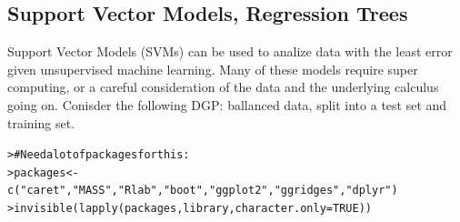 \documentclass[12pt]{article}\usepackage[]{graphicx}\usepackage[]{color}
\makeatletter
\newcommand{\hlnum}[1]{\textcolor[rgb]{0.82,0.78,0.62}{#1}}%
\newcommand{\hlstr}[1]{\textcolor[rgb]{0.82,0.78,0.62}{#1}}%
\newcommand{\hlcom}[1]{\textcolor[rgb]{0.404,0.408,0.42}{#1}}%
\newcommand{\hlstd}[1]{\textcolor[rgb]{0.882,0.878,0.898}{#1}}%
\newcommand{\hlkwb}[1]{\textcolor[rgb]{0.902,0.675,0.196}{#1}}%
\newcommand{\hlkwc}[1]{\textcolor[rgb]{0.812,0.522,0.388}{#1}}%
\newcommand{\hlkwd}[1]{\textcolor[rgb]{0.733,0.388,0.812}{#1}}%
\newenvironment{kframe}{%
 \def\at@end@of@kframe{}%
 \ifinner\ifhmode%
  \def\at@end@of@kframe{\end{minipage}}%
  \begin{minipage}{\columnwidth}%
 \fi\fi%
 \def\FrameCommand##1{\hskip\@totalleftmargin \hskip-\fboxsep
 \colorbox{shadecolor}{##1}\hskip-\fboxsep
     \hskip-\linewidth \hskip-\@totalleftmargin \hskip\columnwidth}%
 \MakeFramed {\advance\hsize-\width
   \@totalleftmargin\z@ \linewidth\hsize
   \@setminipage}}%
 {\par\unskip\endMakeFramed%
 \at@end@of@kframe}
\newenvironment{knitrout}{}{} %
\makeatother
\begin{document}
\begin{flushleft}
\subsection{Support Vector Models, Regression Trees}

Support Vector Models (SVMs) can be used to analize data with the least error given unsupervised machine learning. Many of these models require super computing, or a careful consideration of the data and the underlying calculus going on. Conisder the following DGP: ballanced data, split into a test set and training set.   

\begin{knitrout}
\color{fgcolor}\begin{kframe}
\begin{alltt}
\hlstd{> }\hlcom{# Need a lot of packages for this:}
\hlstd{> }\hlstd{packages} \hlkwb{<-} \hlkwd{c}\hlstd{(}\hlstr{"caret"}\hlstd{,} \hlstr{"MASS"}\hlstd{,} \hlstr{"Rlab"}\hlstd{,} \hlstr{"boot"}\hlstd{,} \hlstr{"ggplot2"}\hlstd{,} \hlstr{"ggridges"}\hlstd{,} \hlstr{"dplyr"}\hlstd{)}
\hlstd{> }\hlkwd{invisible}\hlstd{(} \hlkwd{lapply}\hlstd{(packages, library,} \hlkwc{character.only} \hlstd{=} \hlnum{TRUE}\hlstd{))}
\end{alltt}



\end{kframe}
\end{knitrout}
\end{flushleft}
\end{document}
